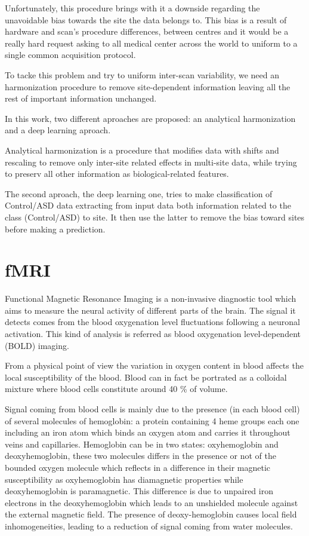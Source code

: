 \documentclass[10pt]{report}
\begin{document}
Unfortunately, this procedure brings with it a downside regarding the unavoidable bias towards the site the data belongs to.
This bias is a result of hardware and scan's procedure differences, between centres and it would be a really hard request asking to all medical center across the world to uniform to a single common acquisition protocol.

To tacke this problem and try to uniform inter-scan variability, we need an harmonization procedure to remove site-dependent information leaving all the rest of important information unchanged.

In this work, two different aproaches are proposed: an analytical harmonization and a deep learning aproach.

Analytical harmonization is a procedure that modifies data with shifts and rescaling to remove only inter-site related effects in multi-site data, while trying to preserv all other information as biological-related features.

The second aproach, the deep learning one, tries to make classification of Control/ASD data extracting from input data both information related to the class (Control/ASD) to site. It then use the latter to remove the bias toward sites before making a prediction.

\chapter{fMRI}\label{chap:fmri}

Functional Magnetic Resonance Imaging is a non-invasive diagnostic tool which aims to measure the neural activity of different parts of the brain.
The signal it detects comes from the blood oxygenation level fluctuations following a neuronal activation.
This kind of analysis is referred as blood oxygenation level-dependent (BOLD) imaging.

From a physical point of view the variation in oxygen content in blood affects the local susceptibility of the blood.
Blood can in fact be portrated as a colloidal mixture where blood cells constitute around 40 \% of volume.

Signal coming from blood cells is mainly due to the presence (in each blood cell) of several molecules of hemoglobin: a protein containing 4 heme groups each one including an iron atom which binds an oxygen atom and carries it throughout veins and capillaries.
Hemoglobin can be in two states: oxyhemoglobin and deoxyhemoglobin, these two molecules differs in the presence or not of the bounded oxygen molecule which reflects in a difference in their magnetic susceptibility as oxyhemoglobin has diamagnetic properties while deoxyhemoglobin is paramagnetic.
This difference is due to unpaired iron electrons in the deoxyhemoglobin which leads to an unshielded molecule against the external magnetic field.
The presence of deoxy-hemoglobin causes local field inhomogeneities, leading to a reduction of signal coming from water molecules.
\end{document}
